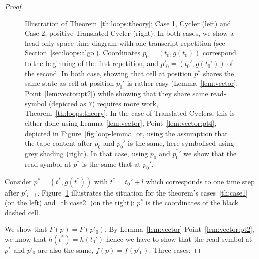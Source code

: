 \begin{proof}
\begin{figure}[h!]
\begin{minipage}[t]{0.5\textwidth}
{\begin{tikzpicture}[every node/.style={minimum size=6mm, draw, font=\scriptsize}, scale=1]



                \end{tikzpicture}
            }
        \end{minipage}
        \caption{Illustration of Theorem~\ref{th:loops:theory}: Case 1, Cycler (left) and Case 2, positive Translated Cycler (right). In both cases, we show a head-only space-time diagram with one transcript repetition (see Section~\ref{sec:loops:algo}). Coordinates $p_0 = (t_0,g(t_0))$ correspond to the beginning of the first repetition, and $p'_0 = (t_0',g(t_0'))$ of the second. In both case, showing that cell at position $p^*$ shares the same state as cell at position $p_0'$ is rather easy (Lemma~\ref{lem:vector}, Point~\ref{lem:vector:pt2}) while showing that they share same read-symbol (depicted as \texttt{?}) requires more work, Theorem~\ref{th:loops:theory}. In the case of Translated Cyclers, this is either done using Lemma~\ref{lem:vector}, Point~\ref{lem:vector:pt4}, depicted in Figure~\ref{fig:loop-lemma} or, using the assumption that the tape content after $p_0$ and $p_0'$ is the same, here symbolised using grey shading (right). In that case, using $\overline{p_0}$ and $\overline{p_0'}$ we show that the read-symbol at $p^*$ is the same that at $\overline{p_0'}$.}\label{fig:loop-proof}
    \end{figure}

    Consider $p^* = (t^*, g(t^*))$ with $t^*=t_0'+l$ which corresponds to one time step after $p'_{l-1}$. Figure~\ref{fig:loop-proof} illustrates the situation for the theorem's cases~\ref{th:case1} (on the left) and~\ref{th:case2} (on the right): $p^*$ is the coordinates of the black dashed cell.

    We show that $F(p) = F(p'_0)$. By Lemma~\ref{lem:vector} Point~\ref{lem:vector:pt2}, we know that $h(t^*) = h(t_0')$ hence we have to show that the read symbol at $p^*$ and $p'_0$ are also the same, \ie $f(p) = f(p'_0)$. Three cases:


\end{proof}
